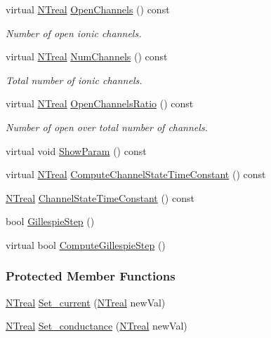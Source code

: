 \begin{DoxyCompactItemize}
virtual \hyperlink{nt__types_8h_a814a97893e9deb1eedcc7604529ba80d}{NTreal} \hyperlink{class_n_t_b_p__membrane__current__o_abfe8fc2cdb225affa855c909fe38f5c9}{OpenChannels} () const 
\begin{DoxyCompactList}\small\item\em Number of open ionic channels. \item\end{DoxyCompactList}\item 
virtual \hyperlink{nt__types_8h_a814a97893e9deb1eedcc7604529ba80d}{NTreal} \hyperlink{class_n_t_b_p__membrane__current__o_a70ddb4ce3759e7a960e94e99cfc0eebf}{NumChannels} () const 
\begin{DoxyCompactList}\small\item\em Total number of ionic channels. \item\end{DoxyCompactList}\item 
virtual \hyperlink{nt__types_8h_a814a97893e9deb1eedcc7604529ba80d}{NTreal} \hyperlink{class_n_t_b_p__membrane__current__o_ac15b64c137b03077fa519c2ade9b05db}{OpenChannelsRatio} () const 
\begin{DoxyCompactList}\small\item\em Number of open over total number of channels. \item\end{DoxyCompactList}\item 
virtual void \hyperlink{class_n_t_b_p__membrane__current__o_a9bcf3d6786c4467dec1c90378d908869}{ShowParam} () const 
\item 
virtual \hyperlink{nt__types_8h_a814a97893e9deb1eedcc7604529ba80d}{NTreal} \hyperlink{class_n_t_b_p__membrane__current__o_a87397e9f3c441eda7ac55c6aabdb57d8}{ComputeChannelStateTimeConstant} () const 
\item 
\hyperlink{nt__types_8h_a814a97893e9deb1eedcc7604529ba80d}{NTreal} \hyperlink{class_n_t_b_p__membrane__current__o_a462256143712600afb596068e8e4e0a0}{ChannelStateTimeConstant} () const 
\item 
bool \hyperlink{class_n_t_b_p__membrane__current__o_afa94d645739392ced54d0c06fd0e70e3}{GillespieStep} ()
\item 
virtual bool \hyperlink{class_n_t_b_p__membrane__current__o_a3f794ba9d58f59a2187f8a771a2532af}{ComputeGillespieStep} ()
\end{DoxyCompactItemize}
\subsubsection*{Protected Member Functions}
\begin{DoxyCompactItemize}
\item 
\hyperlink{nt__types_8h_a814a97893e9deb1eedcc7604529ba80d}{NTreal} \hyperlink{class_n_t_b_p__membrane__current__o_a457d1aeb8e0c6676a5bd61900d0c0ddd}{Set\_\-current} (\hyperlink{nt__types_8h_a814a97893e9deb1eedcc7604529ba80d}{NTreal} newVal)
\item 
\hyperlink{nt__types_8h_a814a97893e9deb1eedcc7604529ba80d}{NTreal} \hyperlink{class_n_t_b_p__membrane__current__o_a507cf21f59bb419370d7ed629b5deb28}{Set\_\-conductance} (\hyperlink{nt__types_8h_a814a97893e9deb1eedcc7604529ba80d}{NTreal} newVal)
\end{DoxyCompactItemize}

